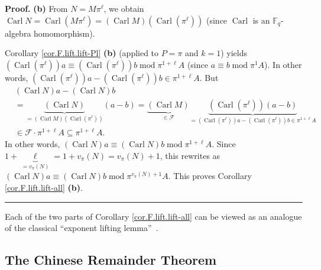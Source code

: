 \documentclass[numbers=enddot,12pt,final,onecolumn,notitlepage]{scrartcl}%
\theoremstyle{definition}
\newenvironment{proof}[1][Proof]{\noindent\textbf{#1.} }{\ \rule{0.5em}{0.5em}}
\begin{document}
\begin{proof}
\textbf{(b)} From $N=M\pi^{\ell}$, we obtain $\operatorname*{Carl}%
N=\operatorname*{Carl}\left(  M\pi^{\ell}\right)  =\left(
\operatorname*{Carl}M\right)  \left(  \operatorname*{Carl}\left(  \pi^{\ell
}\right)  \right)  $ (since $\operatorname*{Carl}$ is an $\mathbb{F}_{q}%
$-algebra homomorphism).

Corollary \ref{cor.F.lift.lift-Pl} \textbf{(b)} (applied to $P=\pi$ and $k=1$)
yields $\left(  \operatorname*{Carl}\left(  \pi^{\ell}\right)  \right)
a\equiv\left(  \operatorname*{Carl}\left(  \pi^{\ell}\right)  \right)
b\operatorname{mod}\pi^{1+\ell}A$ (since $a\equiv b\operatorname{mod}\pi^{1}%
A$). In other words, $\left(  \operatorname*{Carl}\left(  \pi^{\ell}\right)
\right)  a-\left(  \operatorname*{Carl}\left(  \pi^{\ell}\right)  \right)
b\in\pi^{1+\ell}A$. But%
\begin{align*}
&  \left(  \operatorname*{Carl}N\right)  a-\left(  \operatorname*{Carl}%
N\right)  b\\
&  =\underbrace{\left(  \operatorname*{Carl}N\right)  }_{=\left(
\operatorname*{Carl}M\right)  \left(  \operatorname*{Carl}\left(  \pi^{\ell
}\right)  \right)  }\left(  a-b\right)  =\underbrace{\left(
\operatorname*{Carl}M\right)  }_{\in\mathcal{F}}\underbrace{\left(
\operatorname*{Carl}\left(  \pi^{\ell}\right)  \right)  \left(  a-b\right)
}_{=\left(  \operatorname*{Carl}\left(  \pi^{\ell}\right)  \right)  a-\left(
\operatorname*{Carl}\left(  \pi^{\ell}\right)  \right)  b\in\pi^{1+\ell}A}\\
&  \in\mathcal{F}\cdot\pi^{1+\ell}A\subseteq\pi^{1+\ell}A.
\end{align*}
In other words, $\left(  \operatorname*{Carl}N\right)  a\equiv\left(
\operatorname*{Carl}N\right)  b\operatorname{mod}\pi^{1+\ell}A$. Since
$1+\underbrace{\ell}_{=v_{\pi}\left(  N\right)  }=1+v_{\pi}\left(  N\right)
=v_{\pi}\left(  N\right)  +1$, this rewrites as $\left(  \operatorname*{Carl}%
N\right)  a\equiv\left(  \operatorname*{Carl}N\right)  b\operatorname{mod}%
\pi^{v_{\pi}\left(  N\right)  +1}A$. This proves Corollary
\ref{cor.F.lift.lift-all} \textbf{(b)}.
\end{proof}

Each of the two parts of Corollary \ref{cor.F.lift.lift-all} can be viewed as
an analogue of the classical \textquotedblleft exponent lifting
lemma\textquotedblright\ \cite[version with solutions (ancillary file),
(13.84.8)]{reiner-hopf}.

\subsection{The Chinese Remainder Theorem}
\end{document}
